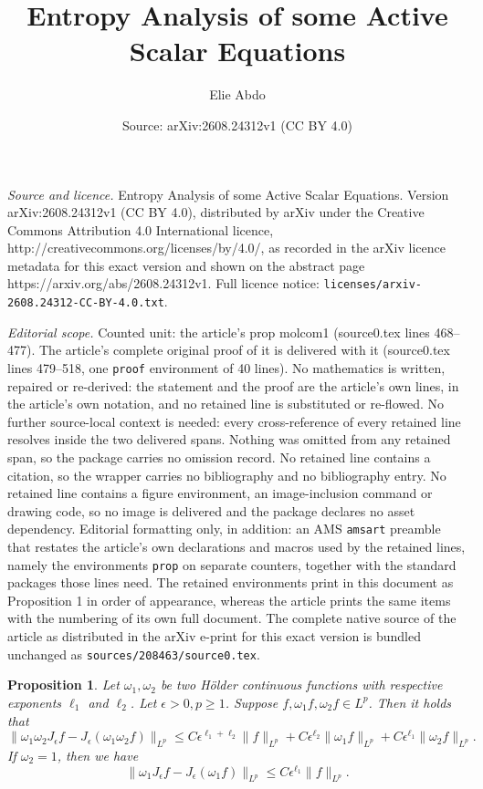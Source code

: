 \documentclass[10pt,a4paper]{amsart}
\title{Entropy Analysis of some Active Scalar Equations}
\author{Elie Abdo}
\date{Source: arXiv:2608.24312v1 (CC BY 4.0)}
\newtheorem{prop}{Proposition}
\newcommand{\be}{\begin{equation}}
\newcommand{\ee}{\end{equation}}
\begin{document}
\maketitle

\noindent\emph{Source and licence.} Entropy Analysis of some Active Scalar Equations. Version arXiv:2608.24312v1 (CC BY 4.0), distributed by arXiv under the Creative Commons Attribution 4.0 International licence, http://creativecommons.org/licenses/by/4.0/, as recorded in the arXiv licence metadata for this exact version and shown on the abstract page https://arxiv.org/abs/2608.24312v1. Full licence notice: \texttt{licenses/arxiv-2608.24312-CC-BY-4.0.txt}.\par\smallskip

\noindent\textit{Editorial scope.} Counted unit: the article's prop molcom1 (source0.tex lines 468--477). The article's complete original proof of it is delivered with it (source0.tex lines 479--518, one \texttt{proof} environment of 40 lines). No mathematics is written, repaired or re-derived: the statement and the proof are the article's own lines, in the article's own notation, and no retained line is substituted or re-flowed.  No further source-local context is needed: every cross-reference of every retained line resolves inside the two delivered spans.  Nothing was omitted from any retained span, so the package carries no omission record.  No retained line contains a citation, so the wrapper carries no bibliography and no bibliography entry.  No retained line contains a figure environment, an image-inclusion command or drawing code, so no image is delivered and the package declares no asset dependency.  Editorial formatting only, in addition: an AMS \texttt{amsart} preamble that restates the article's own declarations and macros used by the retained lines, namely the environments \texttt{prop} on separate counters, together with the standard packages those lines need.  The retained environments print in this document as Proposition 1 in order of appearance, whereas the article prints the same items with the numbering of its own full document.  The complete native source of the article as distributed in the arXiv e-print for this exact version is bundled unchanged as \texttt{sources/208463/source0.tex}.
\begin{prop} Let $\omega_1, \omega_2$ be two H\"older continuous functions with respective exponents $\ell_1$ and $\ell_2$. Let $\epsilon > 0, p \ge 1$. Suppose $f, \omega_1 f, \omega_2 f \in L^p$. Then it holds that 
\be \label{molcom1}
\|\omega_1 \omega_2 J_{\epsilon}f - J_{\epsilon}(\omega_1 \omega_2 f)\|_{L^p}
\le C\epsilon^{\ell_1 + \ell_2} \|f\|_{L^p} + C\epsilon^{\ell_2} \|\omega_1 f\|_{L^p} + C\epsilon^{\ell_1} \|\omega_2 f\|_{L^p}.
\ee  If $\omega_2 = 1$, then we have 
\be \label{malcom5}
\|\omega_1 J_{\epsilon}f - J_{\epsilon}(\omega_1  f)\|_{L^p}
\le C\epsilon^{\ell_1} \|f\|_{L^p}.
\ee 
\end{prop}
\end{document}
